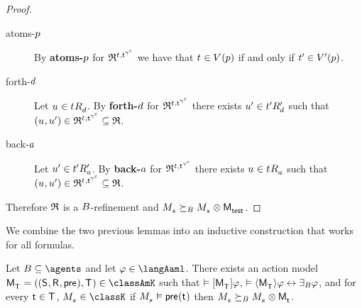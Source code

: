 \begin{proof}
\begin{description}
        \begin{description}
            \item[atoms-$p$]
                By {\bf atoms-$p$} for $\refinement^{\kStateT, \aStateT[\gamma^\agentC]}$ we have that $\kStateT \in \kValuation(\atomP)$ if and only if ${t}^{\prime} \in {V^{\prime}}(p)$.
            \item[forth-$d$]
                Let $\kStateU \in \kSuccessorsD{\kStateT}$.
                By {\bf forth-$d$} for $\refinement^{\kStateT, \aStateT[\gamma^\agentC]}$ there exists ${u}^{\prime} \in {{t}^{\prime}} {R^{\prime}_{d}}$ such that $(\kStateU, \kStateUP) \in \refinement^{\kStateT, \aStateT[\gamma^\agentC]} \subseteq \refinement$.
            \item[back-$a$]
                Let ${u}^{\prime} \in {{t}^{\prime}} {R^{\prime}_{a}}$.
                By {\bf back-$a$} for $\refinement^{\kStateT, \aStateT[\gamma^\agentC]}$ there exists $\kStateU \in \kSuccessorsA{\kStateT}$ such that $(\kStateU, \kStateUP) \in \refinement^{\kStateT, \aStateT[\gamma^\agentC]} \subseteq \refinement$.
        \end{description}
\end{description}

Therefore $\mathfrak{R}$ is a $B$-refinement and $\kPModel{\kStateS} \simulatesBs \kPModel{\kStateS} \exec \aPModel{\aStateTest}$.

\end{proof}

We combine the two previous lemmas into an inductive construction that works for all formulas.

\begin{theorem}\label{aaml-k-synthesis}
Let $\agentsB \subseteq \agents$ and let $\phi \in \langAaml$.
There exists an action model $\aPModelAndTuple{\aStatesT} \in \classAmK$ such that 
$\entails \actionA{\aPModel{\aStatesT}} \phi$,
$\entails \actionE{\aPModel{\aStatesT}} \phi \iff \someactsBs \phi$, and
for every $\aStateT \in \aStatesT$, $\kPModel{\kStateS} \in \classK$ if $\kPModel{\kStateS} \entails \aPrecondition(\aStateT)$ then $\kPModel{\kStateS} \simulatesBs \kPModel{\kStateS} \exec \aPModel{\aStateT}$.
\end{theorem}


